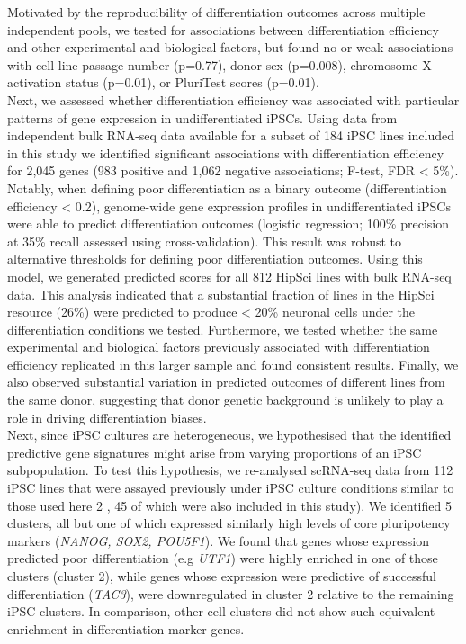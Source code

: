 Motivated by the reproducibility of differentiation outcomes across multiple independent pools, we tested for associations between differentiation efficiency and other experimental and biological factors, but found no or weak associations with cell line passage number (p=0.77), donor sex (p=0.008), chromosome X activation status (p=0.01), or PluriTest scores \cite{muller2011bioinformatic} (p=0.01).\\

Next, we assessed whether differentiation efficiency was associated with particular patterns of gene expression in undifferentiated iPSCs. 
Using data from independent bulk RNA-seq data available for a subset of 184 iPSC lines included in this study \cite{kilpinen2017common, bonder2019systematic} we identified significant associations with differentiation efficiency for 2,045 genes (983 positive and 1,062 negative associations; F-test, FDR < 5\%). 
Notably, when defining poor differentiation as a binary outcome (differentiation efficiency < 0.2), genome-wide gene expression profiles in undifferentiated iPSCs were able to predict differentiation outcomes (logistic regression; 100\% precision at 35\% recall assessed using cross-validation). 
This result was robust to alternative thresholds for defining poor differentiation outcomes. Using this model, we generated predicted scores for all 812 HipSci lines with bulk RNA-seq data.
This analysis indicated that a substantial fraction of lines in the HipSci resource (26\%) were predicted to produce < 20\% neuronal cells under the differentiation conditions we tested.
Furthermore, we tested whether the same experimental and biological factors previously associated with differentiation efficiency replicated in this larger sample and found consistent results.
Finally, we also observed substantial variation in predicted outcomes of different lines from the same donor, suggesting that donor genetic background is unlikely to play a role in driving differentiation biases.\\

Next, since iPSC cultures are heterogeneous, we hypothesised that the identified predictive gene signatures might arise from varying proportions of an iPSC subpopulation. 
To test this hypothesis, we re-analysed scRNA-seq data from 112 iPSC lines that were assayed previously under iPSC culture conditions similar to those used here 2 
\cite{cuomo2020single}, 45 of which were also included in this study). 
We identified 5 clusters, all but one of which expressed similarly high levels of core pluripotency markers (\textit{NANOG, SOX2, POU5F1}). 
We found that genes whose expression predicted poor differentiation (e.g \textit{UTF1}) were highly enriched in one of those clusters (cluster 2), while genes whose expression were predictive of successful differentiation (\textit{TAC3}), were downregulated in cluster 2 relative to the remaining iPSC clusters. 
In comparison, other cell clusters did not show such equivalent enrichment in differentiation marker genes.\\

